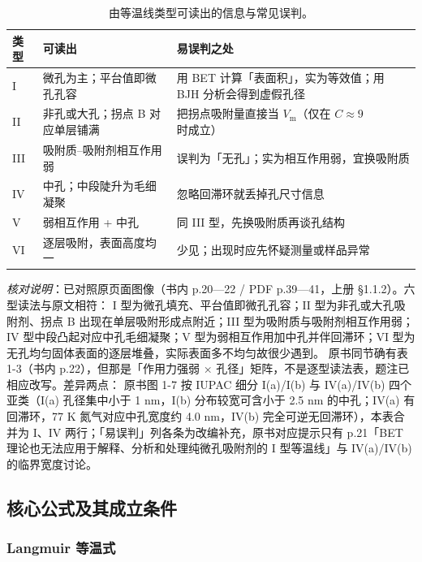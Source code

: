 \begin{table}[htbp]
\centering
\caption{由等温线类型可读出的信息与常见误判。}
\label{tab:isotherm-read}
{\srcsize
\begin{tabularx}{\columnwidth}{@{}lXX@{}}
\toprule
类型 & 可读出 & 易误判之处 \\
\midrule
I & 微孔为主；平台值即微孔孔容 & 用 BET 计算「表面积」，实为等效值；用 BJH 分析会得到虚假孔径 \\
II & 非孔或大孔；拐点 B 对应单层铺满 & 把拐点吸附量直接当 $V_{\mathrm{m}}$（仅在 $C\approx9$ 时成立） \\
III & 吸附质--吸附剂相互作用弱 & 误判为「无孔」；实为相互作用弱，宜换吸附质 \\
IV & 中孔；中段陡升为毛细凝聚 & 忽略回滞环就丢掉孔尺寸信息 \\
V & 弱相互作用 + 中孔 & 同 III 型，先换吸附质再谈孔结构 \\
VI & 逐层吸附，表面高度均一 & 少见；出现时应先怀疑测量或样品异常 \\
\bottomrule
\end{tabularx}}
\end{table}

\emph{核对说明}：已对照原页面图像（书内 p.20—22 / PDF p.39—41，上册 §1.1.2）。六型读法与原文相符：
I 型为微孔填充、平台值即微孔孔容；II 型为非孔或大孔吸附剂、拐点 B 出现在单层吸附形成点附近；III 型为吸附质与吸附剂相互作用弱；
IV 型中段凸起对应中孔毛细凝聚；V 型为弱相互作用加中孔并伴回滞环；VI 型为无孔均匀固体表面的逐层堆叠，实际表面多不均匀故很少遇到。
原书同节确有表 1-3（书内 p.22），但那是「作用力强弱 × 孔径」矩阵，不是逐型读法表，题注已相应改写。差异两点：
原书图 1-7 按 IUPAC 细分 I(a)/I(b) 与 IV(a)/IV(b) 四个亚类（I(a) 孔径集中小于
1 nm，I(b) 分布较宽可含小于 2.5 nm 的中孔；IV(a) 有回滞环，77 K 氮气对应中孔宽度约 4.0
nm，IV(b) 完全可逆无回滞环），本表合并为 I、IV 两行；「易误判」列各条为改编补充，原书对应提示只有 p.21「BET
理论也无法应用于解释、分析和处理纯微孔吸附剂的 I 型等温线」与 IV(a)/IV(b) 的临界宽度讨论。


\subsection{核心公式及其成立条件}

\subsubsection{Langmuir 等温式}

